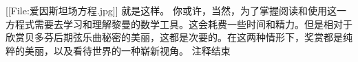                             [[File:爱因斯坦场方程.jpg]]
    就是这样。
    你或许，当然，为了掌握阅读和使用这一方程式需要去学习和理解黎曼的数学工具。这会耗费一些时间和精力。但是相对于欣赏贝多芬后期弦乐曲秘密的美丽，这都是次要的。在这两种情形下，奖赏都是纯粹的美丽，以及看待世界的一种崭新视角。
{{注释结束}}


\noindent
\iffalse
	\graybox{.8}{.65}{
		\bc\textcolor{gray}{\Large{\sffamily Notation used in this document:}}\ec

		\textbf{Abbreviations:}

		EM: electro-magnetic,\\
		UV: ultra-violet,\\
		$\gamma$: gamma-rays,\\
		X: X-rays,\\
		$e^-$: electron,\\
		$\pi$: pion,\\
		$\mu$: muon,\\
		$\nu$: neutrino, etc.\vspace{2ex}

		\textbf{Units:}\\
		International System:\\
		eV: electron volts,\\
		J: Joules,\\
		C: Celsius,\\
		M: mega,\\
		G: giga, etc.\vspace{2ex}

		\textbf{Chemical symbols:}\\
		The elements of the periodic table.\vspace{2ex}

		\textbf{References:}\\
		There are internal (marked in \textcolor{red}{red}) and external (marked in \textcolor{blue}{blue}) references.\vspace{2ex}
	}
\fi
